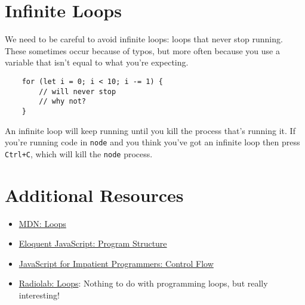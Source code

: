 \section{Infinite Loops}

We need to be careful to avoid infinite loops: loops that never stop running. These sometimes occur because of typos, but more often because you use a variable that isn't equal to what you're expecting.

\begin{verbatim}
    for (let i = 0; i < 10; i -= 1) {
        // will never stop
        // why not?
    }
\end{verbatim}

An infinite loop will keep running until you kill the process that's running it. If you're running code in \texttt{node} and you think you've got an infinite loop then press \texttt{Ctrl+C}, which will kill the \texttt{node} process.

\pagebreak

\section{Additional Resources}

\begin{itemize}[leftmargin=*]
    \item \href{https://developer.mozilla.org/en-US/docs/Web/JavaScript/Guide/Loops_and_iteration}{MDN: Loops}
    \item \href{https://eloquentjavascript.net/02_program_structure.html}{Eloquent JavaScript: Program Structure}
    \item \href{http://exploringjs.com/impatient-js/ch_control-flow.html}{JavaScript for Impatient Programmers: Control Flow}
    \item \href{https://www.wnycstudios.org/story/radiolab-loops}{Radiolab: Loops}: Nothing to do with programming loops, but really interesting!
\end{itemize}
